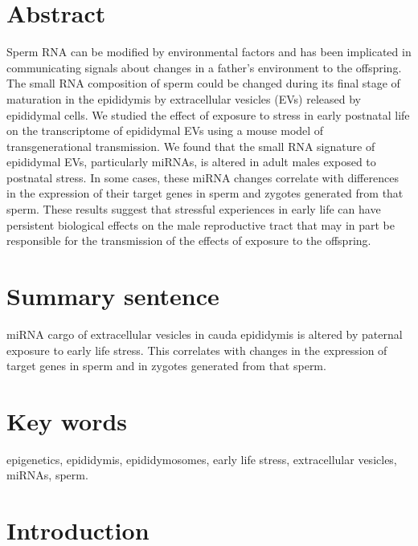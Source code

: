 \documentclass[12pt,twoside]{reedthesis}
\begin{document}
\hypertarget{abstract-1}{%
\section{Abstract}\label{abstract-1}}

Sperm RNA can be modified by environmental factors and has been
implicated in communicating signals about changes in a father's
environment to the offspring. The small RNA composition of sperm could
be changed during its final stage of maturation in the epididymis by
extracellular vesicles (EVs) released by epididymal cells. We studied
the effect of exposure to stress in early postnatal life on the
transcriptome of epididymal EVs using a mouse model of transgenerational
transmission. We found that the small RNA signature of epididymal EVs,
particularly miRNAs, is altered in adult males exposed to postnatal
stress. In some cases, these miRNA changes correlate with differences in
the expression of their target genes in sperm and zygotes generated from
that sperm. These results suggest that stressful experiences in early
life can have persistent biological effects on the male reproductive
tract that may in part be responsible for the transmission of the
effects of exposure to the offspring.

\hypertarget{summary-sentence}{%
\section{Summary sentence}\label{summary-sentence}}

miRNA cargo of extracellular vesicles in cauda epididymis is altered by
paternal exposure to early life stress. This correlates with changes in
the expression of target genes in sperm and in zygotes generated from
that sperm.

\hypertarget{key-words}{%
\section{Key words}\label{key-words}}

epigenetics, epididymis, epididymosomes, early life stress,
extracellular vesicles, miRNAs, sperm.

\newpage

\hypertarget{introduction-1}{%
\section{Introduction}\label{introduction-1}}
\end{document}
